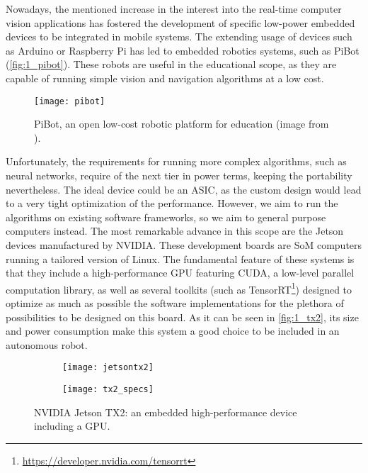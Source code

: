 Nowadays, the mentioned increase in the interest into the real-time computer vision applications has fostered the development of specific low-power embedded devices to be integrated in mobile systems. The extending usage of devices such as Arduino or Raspberry Pi has led to embedded robotics systems, such as PiBot \cite{pibot} (\autoref{fig:1_pibot}). These robots are useful in the educational scope, as they are capable of running simple vision and navigation algorithms at a low cost.\\
\begin{figure}[h]
	\centering
	\texttt{[image: pibot]}
	\caption{PiBot, an open low-cost robotic platform for education (image from \cite{pibot}).}
	\label{fig:1_pibot}
\end{figure}
Unfortunately, the requirements for running more complex algorithms, such as neural networks, require of the next tier in power terms, keeping the portability nevertheless. The ideal device could be an ASIC, as the custom design would lead to a very tight optimization of the performance. However, we aim to run the algorithms on existing software frameworks, so we aim to general purpose computers instead. The most remarkable advance in this scope are the Jetson devices manufactured by NVIDIA. These development boards are SoM computers running a tailored version of Linux. The fundamental feature of these systems is that they include a high-performance GPU featuring CUDA, a low-level parallel computation library, as well as several toolkits (such as TensorRT\footnote{\url{https://developer.nvidia.com/tensorrt}}) designed to optimize as much as possible the software implementations for the plethora of possibilities to be designed on this board. As it can be seen in \autoref{fig:1_tx2}, its size and power consumption make this system a good choice to be included in an autonomous robot. 
\begin{figure}[h!]
	\begin{subfigure}[h]{0.45\linewidth}
		\centering
		\texttt{[image: jetsontx2]}

	\end{subfigure}
	\begin{subfigure}[h]{0.45\linewidth}
		\centering
		\texttt{[image: tx2\_specs]}
	\end{subfigure}
	\caption{NVIDIA Jetson TX2: an embedded high-performance device including a GPU.}
	\label{fig:1_tx2}
\end{figure}


